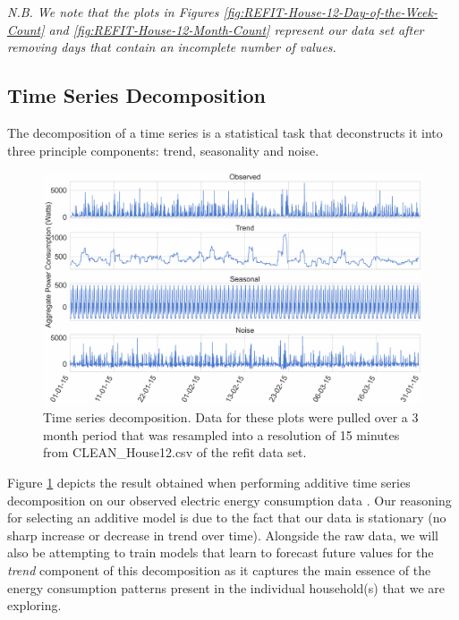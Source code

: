 \noindent \newline \textit{N.B. We note that the plots in Figures \ref{fig:REFIT-House-12-Day-of-the-Week-Count} and \ref{fig:REFIT-House-12-Month-Count} represent our data set after removing days that contain an incomplete number of values.}

\subsection{Time Series Decomposition}
\label{subsec:Exploratory-Data-Analysis:Data-Visualization:Time-Series-Decomposition}
The decomposition of a time series is a statistical task that deconstructs it into three principle components: trend, seasonality and noise.

\begin{figure}[H]
    \centering
    \includegraphics[width=\textwidth]{Images/Chapter 4/REFIT/REFIT-House-12-Time-Series-Decomposition-NoSmoothing.pdf}
    \caption{Time series decomposition. Data for these plots were pulled over a 3 month period that was resampled into a resolution of 15 minutes from CLEAN\_House12.csv of the \gls{refit} data set.}
    \label{fig:REFIT-House-12-Time-Series-Decomposition}
\end{figure}

\noindent \newline Figure \ref{fig:REFIT-House-12-Time-Series-Decomposition} depicts the result obtained when performing additive time series decomposition on our observed electric energy consumption data \cite{Chujai}. Our reasoning for selecting an additive model is due to the fact that our data is stationary (\ie no sharp increase or decrease in trend over time).   Alongside the raw data, we will also be attempting to train models that learn to forecast future values for the \textit{trend} component of this decomposition as it captures the main essence of the energy consumption patterns present in the individual household(s) that we are exploring.

